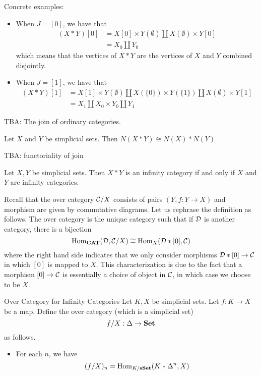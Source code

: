 \documentclass[a4paper]{article}
\begin{document}
Concrete examples: 
\begin{itemize}
\item When $J=[0]$, we have that 
\begin{align*}
(X\ast Y)[0]&=X[0]\times Y(\emptyset)\amalg X(\emptyset)\times Y[0]\\
&=X_0\amalg Y_0
\end{align*}
which means that the vertices of $X\ast Y$ are the vertices of $X$ and $Y$ combined disjointly. 
\item When $J=[1]$, we have that 
\begin{align*}
(X\ast Y)[1]&=X[1]\times Y(\emptyset)\amalg X(\{0\})\times Y(\{1\}) \amalg X(\emptyset)\times Y[1]\\
&=X_1\amalg X_0\times Y_0\amalg Y_1
\end{align*}
\end{itemize}

TBA: The join of ordinary categories. 

\begin{lmm}{}{} Let $X$ and $Y$ be simplicial sets. Then $N(X\ast Y)\cong N(X)\ast N(Y)$
\end{lmm}

TBA: functoriality of join

\begin{prp}{}{} Let $X,Y$ be simplicial sets. Then $X\ast Y$ is an infinity category if and only if $X$ and $Y$ are infinity categories. 
\end{prp}

Recall that the over category $\mathcal{C}/X$ consists of pairs $(Y,f:Y\to X)$ and morphism are given by commutative diagrams. Let us rephrase the definition as follows. The over category is the unique category such that if $\mathcal{D}$ is another category, there is a bijection $$\operatorname{Hom}_\bold{CAT}(\mathcal{D},\mathcal{C}/X)\cong\operatorname{Hom}_X(\mathcal{D}\ast[0],\mathcal{C})$$ where the right hand side indicates that we only consider morphisms $\mathcal{D}\ast[0]\to\mathcal{C}$ in which $[0]$ is mapped to $X$. This characterization is due to the fact that a morphism $[0]\to\mathcal{C}$ is essentially a choice of object in $\mathcal{C}$, in which case we choose to be $X$. 

\begin{defn}{Over Category for Infinity Categories}{} Let $K,X$ be simplicial sets. Let $f:K\to X$ be a map. Define the over category (which is a simplicial set) $$f/X:\Delta\to\bold{Set}$$ as follows. 
\begin{itemize}
\item For each $n$, we have $$(f/X)_n=\operatorname{Hom}_{K/\bold{sSet}}(K\ast\Delta^n,X)$$
\end{itemize}
\end{defn}
\end{document}
